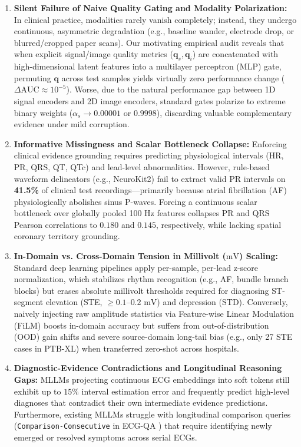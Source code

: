 \documentclass[preprint,12pt]{elsarticle}
\begin{document}
\begin{enumerate}
    \item \textbf{Silent Failure of Naive Quality Gating and Modality Polarization:} In clinical practice, modalities rarely vanish completely; instead, they undergo continuous, asymmetric degradation (e.g., baseline wander, electrode drop, or blurred/cropped paper scans). Our motivating empirical audit reveals that when explicit signal/image quality metrics ($\bm{q}_s, \bm{q}_i$) are concatenated with high-dimensional latent features into a multilayer perceptron (MLP) gate, permuting $\bm{q}$ across test samples yields virtually zero performance change ($\Delta\text{AUC} \approx 10^{-5}$). Worse, due to the natural performance gap between 1D signal encoders and 2D image encoders, standard gates polarize to extreme binary weights ($\alpha_s \to 0.00001$ or $0.9998$), discarding valuable complementary evidence under mild corruption.
    \item \textbf{Informative Missingness and Scalar Bottleneck Collapse:} Enforcing clinical evidence grounding requires predicting physiological intervals (HR, PR, QRS, QT, QTc) and lead-level abnormalities. However, rule-based waveform delineators (e.g., NeuroKit2) fail to extract valid PR intervals on \textbf{41.5\%} of clinical test recordings---primarily because atrial fibrillation (AF) physiologically abolishes sinus P-waves. Forcing a continuous scalar bottleneck over globally pooled 100 Hz features collapses PR and QRS Pearson correlations to $0.180$ and $0.145$, respectively, while lacking spatial coronary territory grounding.
    \item \textbf{In-Domain vs. Cross-Domain Tension in Millivolt ($\text{mV}$) Scaling:} Standard deep learning pipelines apply per-sample, per-lead z-score normalization, which stabilizes rhythm recognition (e.g., AF, bundle branch blocks) but erases absolute millivolt thresholds required for diagnosing ST-segment elevation (STE, $\ge 0.1\text{--}0.2\text{ mV}$) and depression (STD). Conversely, naively injecting raw amplitude statistics via Feature-wise Linear Modulation (FiLM) boosts in-domain accuracy but suffers from out-of-distribution (OOD) gain shifts and severe source-domain long-tail bias (e.g., only 27 STE cases in PTB-XL) when transferred zero-shot across hospitals.
    \item \textbf{Diagnostic-Evidence Contradictions and Longitudinal Reasoning Gaps:} MLLMs projecting continuous ECG embeddings into soft tokens still exhibit up to $15\%$ interval estimation error \cite{ecgr1_2026} and frequently predict high-level diagnoses that contradict their own intermediate evidence predictions. Furthermore, existing MLLMs struggle with longitudinal comparison queries (\texttt{Comparison-Consecutive} in ECG-QA \cite{ecgqa2023}) that require identifying newly emerged or resolved symptoms across serial ECGs.
\end{enumerate}
\end{document}
